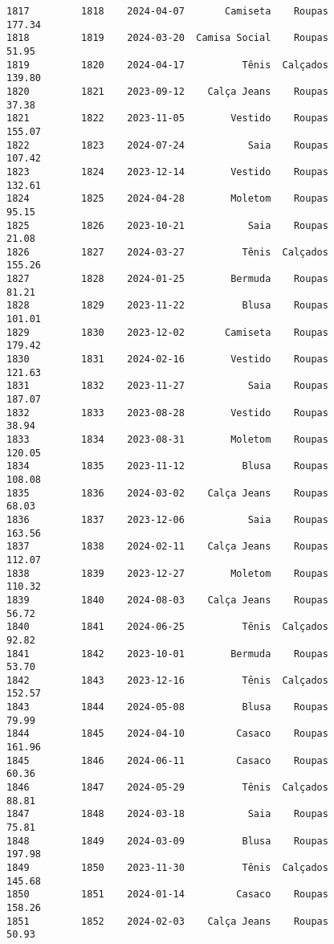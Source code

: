 \documentclass[11pt]{article}
\begin{document}
\begin{Verbatim}[commandchars=\\\{\}]
1817         1818    2024-04-07       Camiseta    Roupas          177.34   
1818         1819    2024-03-20  Camisa Social    Roupas           51.95   
1819         1820    2024-04-17          Tênis  Calçados          139.80   
1820         1821    2023-09-12    Calça Jeans    Roupas           37.38   
1821         1822    2023-11-05        Vestido    Roupas          155.07   
1822         1823    2024-07-24           Saia    Roupas          107.42   
1823         1824    2023-12-14        Vestido    Roupas          132.61   
1824         1825    2024-04-28        Moletom    Roupas           95.15   
1825         1826    2023-10-21           Saia    Roupas           21.08   
1826         1827    2024-03-27          Tênis  Calçados          155.26   
1827         1828    2024-01-25        Bermuda    Roupas           81.21   
1828         1829    2023-11-22          Blusa    Roupas          101.01   
1829         1830    2023-12-02       Camiseta    Roupas          179.42   
1830         1831    2024-02-16        Vestido    Roupas          121.63   
1831         1832    2023-11-27           Saia    Roupas          187.07   
1832         1833    2023-08-28        Vestido    Roupas           38.94   
1833         1834    2023-08-31        Moletom    Roupas          120.05   
1834         1835    2023-11-12          Blusa    Roupas          108.08   
1835         1836    2024-03-02    Calça Jeans    Roupas           68.03   
1836         1837    2023-12-06           Saia    Roupas          163.56   
1837         1838    2024-02-11    Calça Jeans    Roupas          112.07   
1838         1839    2023-12-27        Moletom    Roupas          110.32   
1839         1840    2024-08-03    Calça Jeans    Roupas           56.72   
1840         1841    2024-06-25          Tênis  Calçados           92.82   
1841         1842    2023-10-01        Bermuda    Roupas           53.70   
1842         1843    2023-12-16          Tênis  Calçados          152.57   
1843         1844    2024-05-08          Blusa    Roupas           79.99   
1844         1845    2024-04-10         Casaco    Roupas          161.96   
1845         1846    2024-06-11         Casaco    Roupas           60.36   
1846         1847    2024-05-29          Tênis  Calçados           88.81   
1847         1848    2024-03-18           Saia    Roupas           75.81   
1848         1849    2024-03-09          Blusa    Roupas          197.98   
1849         1850    2023-11-30          Tênis  Calçados          145.68   
1850         1851    2024-01-14         Casaco    Roupas          158.26   
1851         1852    2024-02-03    Calça Jeans    Roupas           50.93   

\end{Verbatim}
\end{document}
